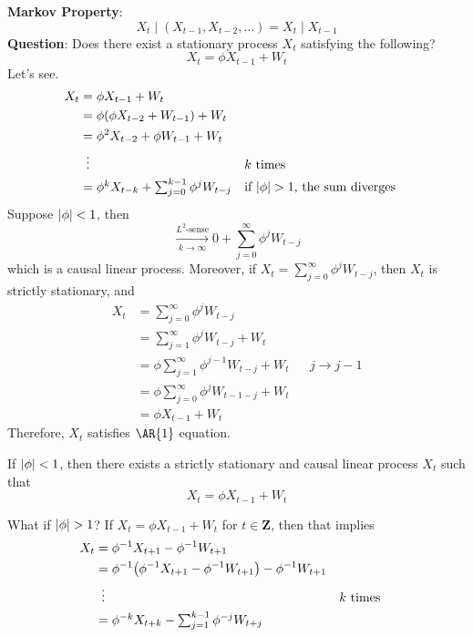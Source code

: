 \textbf{Markov Property}:
\[ X_t\mid (X_{t-1},X_{t-2},\ldots)=X_t\mid X_{t-1} \]
\textbf{Question}: Does there exist a stationary process
$ X_t $ satisfying the following?
\[ X_t=\phi X_{t-1}+W_t \]
Let's see.
\begin{align*}
    X_t
     & =\phi X_{t-1}+W_t                                                                                           \\
     & =\phi(\phi X_{t-2}+W_{t-1})+W_t                                                                             \\
     & =\phi^2X_{t-2}+\phi W_{t-1}+W_t                                                                             \\
     & \vdotswithin{=}                                           &  & k\text{ times}                               \\
     & =\textstyle\phi^k X_{t-k}+\sum_{j=0}^{k-1} \phi^j W_{t-j} &  & \text{if $ \abs{\phi}>1 $, the sum diverges} \\
\end{align*}
Suppose $ \lvert\phi\rvert<1 $, then
\[ \xrightarrow[k\to\infty]{L^2\text{-sense}}0+
    \sum_{j=0}^{\infty} \phi^j W_{t-j} \]
which is a causal linear process. Moreover, if
$ X_t=\sum_{j=0}^{\infty} \phi^j W_{t-j} $, then
$ X_t $ is strictly stationary, and
\begin{align*}
    X_t
     & =\sum_{j=0}^{\infty} \phi^j W_{t-j}                           \\
     & =\sum_{j=1}^{\infty}\phi^j W_{t-j}+W_t                        \\
     & =\phi \sum_{j=1}^{\infty} \phi^{j-1}W_{t-j}+W_t &  & j\to j-1 \\
     & =\phi \sum_{j=0}^{\infty} \phi^j W_{t-1-j}+W_t                \\
     & =\phi X_{t-1}+W_t
\end{align*}
Therefore, $ X_t $ satisfies $ \AR{1} $ equation.
\begin{Theorem}{}{}
    If $ \lvert\phi\rvert<1 $, then there exists a strictly stationary
    and causal linear process $ X_t $ such that
    \[ X_t=\phi X_{t-1}+W_t \]
\end{Theorem}
What if $ \lvert\phi\rvert>1 $? If $ X_t=\phi X_{t-1}+W_t $ for $ t\in\mathbf{Z} $,
then that implies
\begin{align*}
    X_t
     & =\phi^{-1}X_{t+1}-\phi^{-1}W_{t+1}                                                           \\
     & =\phi^{-1}\bigl(\phi^{-1}X_{t+1}-\phi^{-1}W_{t+1}\bigr)-\phi^{-1}W_{t+1}                     \\
     & \vdotswithin{=}                                                          &  & k\text{ times} \\
     & =\textstyle\phi^{-k}X_{t+k}-\sum_{j=1}^{k-1} \phi^{-j}W_{t+j}
\end{align*}
